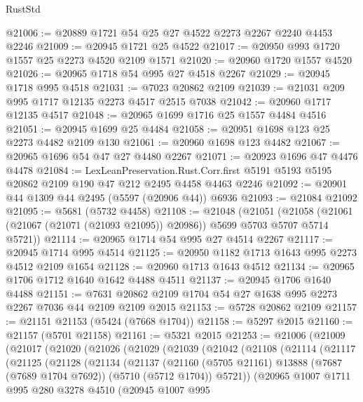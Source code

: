 \begin{lexlean}{RustStd}
\begin{coremodule}
@21006 := @20889 @1721 @54 @25 @27 @4522 @2273 @2267 @2240 @4453 @2246
@21009 := @20945 @1721 @25 @4522
@21017 := @20950 @993 @1720 @1557 @25 @2273 @4520 @2109 @1571
@21020 := @20960 @1720 @1557 @4520
@21026 := @20965 @1718 @54 @995 @27 @4518 @2267
@21029 := @20945 @1718 @995 @4518
@21031 := @7023 @20862 @2109
@21039 := @21031 @209 @995 @1717 @12135 @2273 @4517 @2515 @7038
@21042 := @20960 @1717 @12135 @4517
@21048 := @20965 @1699 @1716 @25 @1557 @4484 @4516
@21051 := @20945 @1699 @25 @4484
@21058 := @20951 @1698 @123 @25 @2273 @4482 @2109 @130
@21061 := @20960 @1698 @123 @4482
@21067 := @20965 @1696 @54 @47 @27 @4480 @2267
@21071 := @20923 @1696 @47 @4476 @4478
@21084 := LexLeanPreservation.Rust.Corr.first
    @5191
    @5193
    @5195
    @20862
    @2109
    @190
    @47
    @212
    @2495
    @4458
    @4463
    @2246
@21092 := @20901 @44 @1309 @44 @2495 (@5597 (@20906 @44)) @6936
@21093 := @21084 @21092
@21095 := @5681 (@5732 @4458)
@21108 := @21048
    (@21051
      (@21058 (@21061 (@21067 (@21071 (@21093 @21095)) @20986)) @5699 @5703 @5707 @5714 @5721))
@21114 := @20965 @1714 @54 @995 @27 @4514 @2267
@21117 := @20945 @1714 @995 @4514
@21125 := @20950 @1182 @1713 @1643 @995 @2273 @4512 @2109 @1654
@21128 := @20960 @1713 @1643 @4512
@21134 := @20965 @1706 @1712 @1640 @1642 @4488 @4511
@21137 := @20945 @1706 @1640 @4488
@21151 := @7631 @20862 @2109 @1704 @54 @27 @1638 @995 @2273 @2267 @7036 @44 @2109 @2109 @2015
@21153 := @5728 @20862 @2109
@21157 := @21151 @21153 (@5424 (@7668 @1704))
@21158 := @5297 @2015
@21160 := @21157 (@5701 @21158)
@21161 := @5321 @2015
@21253 := @21006
    (@21009
      (@21017
        (@21020
          (@21026
            (@21029
              (@21039
                (@21042
                  (@21108
                    (@21114
                      (@21117
                        (@21125
                          (@21128
                            (@21134
                              (@21137
                                (@21160
                                  (@5705 @21161)
                                  @13888
                                  (@7687 (@7689 @1704 @7692))
                                  (@5710 (@5712 @1704))
                                  @5721))
                              (@20965
                                @1007
                                @1711
                                @995
                                @280
                                @3278
                                @4510
                                (@20945
                                  @1007
                                  @995

\end{coremodule}
\end{lexlean}
